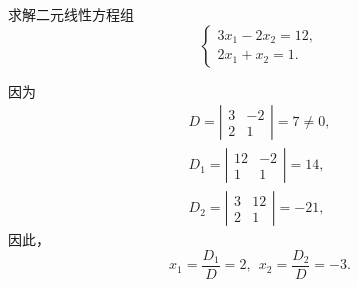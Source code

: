 \begin{frame}
\begin{li}
  求解二元线性方程组
  $$
  \left\{
    \begin{array}{l}
      3x_1 - 2x_2 = 12, \\[0.2cm]
      2x_1 + x_2  = 1.
    \end{array}
  \right.
  $$
\end{li} \pause
\begin{jie}
因为
$$
\begin{array}{l}
D = \left|
\begin{array}{cc}
3 & -2 \\
2 & 1 
\end{array}
\right| = 7 \ne 0,\\[0.4cm]
D_1 = \left|
\begin{array}{cc}
12 & -2 \\
1 & 1 
\end{array}
\right| = 14 , \\[0.4cm]
D_2 = \left|
\begin{array}{cc}
3 & 12 \\
2 & 1 
\end{array}
\right| = -21,
\end{array}
$$
因此，
$$
x_1=\frac{D_1}{D}=2, \ \ x_2 = \frac{D_2}{D} = -3.
$$
\end{jie}

\end{frame}


